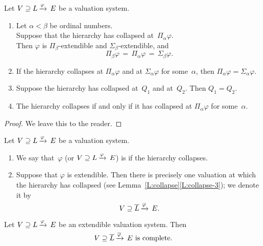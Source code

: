 \documentclass[main.tex]{subfiles}
\begin{document}
\begin{lem}
\label{L:collapse}
Let $V \supseteq L\,\smash{\xrightarrow{\varphi}\,E}$
be a valuation system.
\begin{enumerate}
\item
\label{L:collapse-1}
Let $\alpha<\beta$ be ordinal numbers.\\
Suppose that the hierarchy has collapsed at~$\Pi_\alpha \varphi$.\\
Then $\varphi$ is $\Pi_\beta$-extendible and $\Sigma_\beta$-extendible,
and  
\begin{equation*}
\Pi_\beta \varphi \,=\, \Pi_\alpha \varphi \,=\, \Sigma_\beta \varphi.
\end{equation*}
\item
\label{L:collapse-2}
If the hierarchy collapses
at $\Pi_\alpha \varphi$ and at $\Sigma_\alpha\varphi$
for some~$\alpha$,
then $\Pi_\alpha\varphi = \Sigma_\alpha\varphi$.

\item
\label{L:collapse-3}
Suppose the hierarchy has collapsed at~$Q_1$ and at~$Q_2$.
Then $Q_1 = Q_2$.
\item
\label{L:collapse-4}
The hierarchy collapses
if and only if 
it has collapsed at $\Pi_\alpha \varphi$
for some~$\alpha$.
\end{enumerate}
\end{lem}
\begin{proof}
We leave this to the reader.
\end{proof}
%
%
\begin{dfn}
\label{D:extendible}
Let $V \supseteq L\,\smash{\xrightarrow{\varphi}\,E}$ be a valuation system.
\begin{enumerate}
\item
\label{D:extendible-1}
We say that~$\varphi$ (or  $V \supseteq L\,\smash{\xrightarrow{\varphi}\,E}$) is 
if the hierarchy collapses.

\item
\label{D:extendible-2}
Suppose that $\varphi$ is extendible.
Then there is precisely one valuation
at which the hierarchy has collapsed
(see Lemma~\ref{L:collapse}\ref{L:collapse-3});
we denote it by
\begin{equation*}
V \supseteq \overline L\,\smash{\xrightarrow{\overline\varphi}\,E}.
\end{equation*}
\end{enumerate}
\end{dfn}
%
%
\begin{lem}
\label{L:complete}
Let $V \supseteq L\,\smash{\xrightarrow{\varphi}\,E}$ be an extendible valuation system.
Then
\begin{equation*}
V \supseteq \overline L\,\smash{\xrightarrow{\overline\varphi}\,E}
\text{ is complete.}
\end{equation*}
\end{lem}
\end{document}
